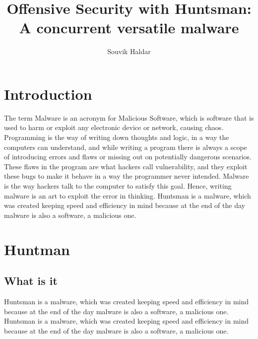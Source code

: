 \documentclass[12pt]{article}
\title{Offensive Security with Huntsman: A concurrent versatile malware}
\author{Souvik Haldar}
\begin{document}
\maketitle

\section{Introduction}
The term Malware is an acronym for Malicious Software, which is software that is used to harm or exploit any electronic device or network, causing chaos. 
Programming is the way of writing down thoughts and logic, in a way the computers can understand, and while writing a program there is always a scope of introducing errors and flaws or missing out on potentially dangerous scenarios. These flaws in the program are what hackers call vulnerability, and they exploit these bugs to make it behave in a way the programmer never intended. Malware is the way hackers talk to the computer to satisfy this goal. Hence, writing malware is an art to exploit the error in thinking. 
Huntsman is a malware, which was created keeping speed and efficiency in mind because at the end of the day malware is also a software, a malicious one.

\section{Huntman}
\subsection{What is it} 
Huntsman is a malware, which was created keeping speed and efficiency in mind because at the end of the day malware is also a software, a malicious one.  
Huntsman is a malware, which was created keeping speed and efficiency in mind because at the end of the day malware is also a software, a malicious one.
\end{document}
